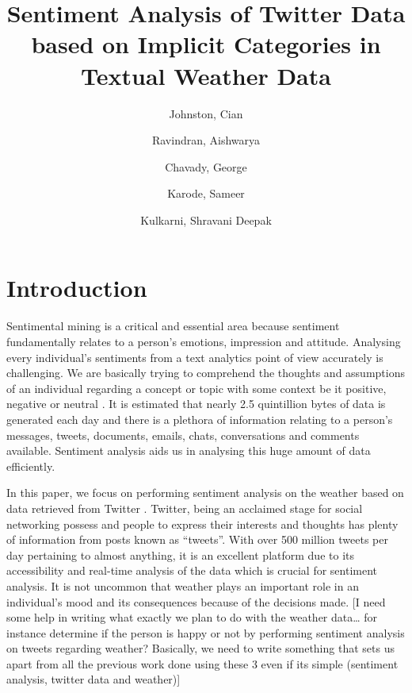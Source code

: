 \documentclass[a4paper,10pt]{article}
\begin{document}
    \title{Sentiment Analysis of Twitter Data based on Implicit Categories in Textual Weather Data}
    \author{
        Johnston, Cian
        \and
        Ravindran, Aishwarya
        \and
        Chavady, George
        \and
        Karode, Sameer
        \and
        Kulkarni, Shravani Deepak
    }

    \maketitle
    \section{Introduction}

    Sentimental mining is a critical and essential area because sentiment fundamentally relates to a person’s emotions, impression and attitude. Analysing every individual’s sentiments from a text analytics point of view accurately is challenging. We are basically trying to comprehend the thoughts and assumptions of an individual regarding a concept or topic with some context be it positive, negative or neutral . It is estimated that nearly 2.5 quintillion bytes of data is generated each day  and there is a plethora of information relating to a person’s messages, tweets, documents, emails, chats, conversations and comments available. Sentiment analysis aids us in analysing this huge amount of data efficiently.

    In this paper, we focus on performing sentiment analysis on the weather based on data retrieved from Twitter . Twitter, being an acclaimed stage for social networking possess and people to express their interests and thoughts has plenty of information from posts known as “tweets”. With over 500 million tweets per day pertaining to almost anything, it is an excellent platform due to its accessibility and real-time analysis of the data which is crucial for sentiment analysis. It is not uncommon that weather plays an important role in an individual’s mood and its consequences because of the decisions made. [I need some help in writing what exactly we plan to do with the weather data… for instance determine if the person is happy or not by performing sentiment analysis on tweets regarding weather? Basically, we need to write something that sets us apart from all the previous work done using these 3 even if its simple (sentiment analysis, twitter data and weather)]
\end{document}
